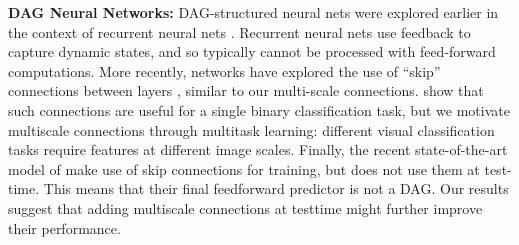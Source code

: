\documentclass[10pt,twocolumn,letterpaper]{article}
\begin{document}

{\bf DAG Neural Networks:} DAG-structured neural nets were explored earlier in the context of recurrent neural nets \cite{baldi2003principled,graves2009offline}. Recurrent neural nets use feedback to capture dynamic states, and so typically cannot be processed with feed-forward computations. %
More recently, networks have explored the use of ``skip'' connections between layers \cite{raiko-aistats-12,szegedy2014going,sermanet2013pedestrian}, similar to our multi-scale connections. \cite{raiko-aistats-12} show that such connections are useful for a single binary classification task, but we motivate multiscale connections through multitask learning: different visual classification tasks require features at different image scales. %
Finally, the recent state-of-the-art model of \cite{szegedy2014going} make use of skip connections for training, but does not use them at test-time. This means that their final feedforward predictor is not a DAG. Our results suggest that adding multiscale connections at testtime might further improve their performance.
\end{document}
